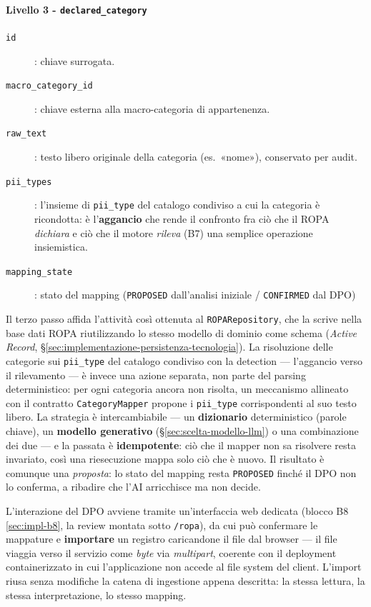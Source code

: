 \paragraph*{Livello 3 - \texttt{declared\_category}}
\begin{description}
	\item[\texttt{id}]: chiave surrogata.
	\item[\texttt{macro\_category\_id}]: chiave esterna alla macro-categoria di appartenenza.
	\item[\texttt{raw\_text}]: testo libero originale della categoria (es.\ «nome»), conservato per audit.
	\item[\texttt{pii\_types}]: l'insieme di \texttt{pii\_type} del catalogo condiviso a cui la categoria è ricondotta: è l'\textbf{aggancio} che rende il confronto fra ciò che il ROPA \emph{dichiara} e ciò che il motore \emph{rileva} (B7) una semplice operazione insiemistica.
	\item[\texttt{mapping\_state}]: stato del mapping (\texttt{PROPOSED} dall'analisi iniziale / \texttt{CONFIRMED} dal DPO)
\end{description}

Il terzo passo affida l'attività così ottenuta al \texttt{ROPARepository}, che la scrive nella base dati ROPA riutilizzando lo stesso modello di dominio come schema (\emph{Active Record}, §\ref{sec:implementazione-persistenza-tecnologia}). La risoluzione delle categorie sui \texttt{pii\_type} del catalogo condiviso con la detection --- l'aggancio verso il rilevamento --- è invece una azione separata, non parte del parsing deterministico: per ogni categoria ancora non risolta, un meccanismo allineato con il contratto \texttt{CategoryMapper} propone i \texttt{pii\_type} corrispondenti al suo testo libero. La strategia è intercambiabile --- un \textbf{dizionario} deterministico (parole chiave), un \textbf{modello generativo} (§\ref{sec:scelta-modello-llm}) o una combinazione dei due --- e la passata è \textbf{idempotente}: ciò che il mapper non sa risolvere resta invariato, così una riesecuzione mappa solo ciò che è nuovo. Il risultato è comunque una \emph{proposta}: lo stato del mapping resta \texttt{PROPOSED} finché il DPO non lo conferma, a ribadire che l'AI arricchisce ma non decide.

L'interazione del DPO avviene tramite un'interfaccia web dedicata (blocco B8 \ref{sec:impl-b8}, la review montata sotto \texttt{/ropa}), da cui può confermare le mappature e \textbf{importare} un registro caricandone il file dal browser --- il file viaggia verso il servizio come \emph{byte} via \emph{multipart}, coerente con il deployment containerizzato in cui l'applicazione non accede al file system del client. L'import riusa senza modifiche la catena di ingestione appena descritta: la stessa lettura, la stessa interpretazione, lo stesso mapping.

